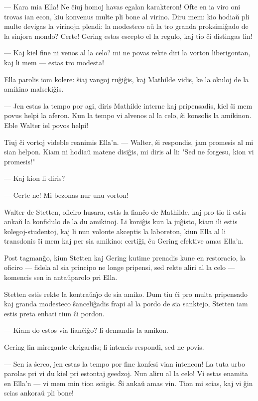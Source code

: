  --- Kara mia Ella! Ne \^ciuj homoj havas egalan karakteron! Ofte en ia
viro oni trovas ian econ, kiu konvenus multe pli bone al virino.
Diru mem: kio hodia\u u pli multe devigas la virinojn plendi: la
modesteco a\u u la tro granda proksimi\^gado de la sinjora mondo?
Certe! Gering estas escepto el la regulo, kaj tio \^ci distingas
lin!

 --- Kaj kiel fine ni venos al la celo? mi ne povas rekte diri la
vorton liberigontan, kaj li mem --- estas tro modesta!

   Ella parolis iom kolere: \^siaj vangoj ru\^gi\^gis, kaj Mathilde vidis,
ke la okuloj de la amikino malseki\^gis.

 --- Jen estas la tempo por agi, diris Mathilde interne kaj
pripensadis, kiel \^si mem povus helpi la aferon. Kun la tempo vi
alvenos al la celo, \^si konsolis la amikinon. Eble Walter iel povos
helpi!

   Tiuj \^ci vortoj videble reanimis Ella'n. --- Walter, \^si respondis,
jam promesis al mi sian helpon. Kiam ni hodia\u u matene disi\^gis,
mi diris al li: "Sed ne forgesu, kion vi promesis!"

 --- Kaj kion li diris?

 --- Certe ne! Mi bezonas nur unu vorton!

   Walter de Stetten, oficiro husara, estis la fian\^co de Mathilde, kaj
pro tio li estis anka\u u la konfidulo de la du amikinoj. Li
koni\^gis kun la ju\^gisto, kiam ili estis kolegoj-studentoj, kaj li
nun volonte akceptis la laboreton, kiun Ella al li transdonis \^si
mem kaj per sia amikino: certi\^gi, \^cu Gering efektive amas
Ella'n.

   Post tagman\^go, kiun Stetten kaj Gering kutime prenadis kune en
restoracio, la oficiro --- fidela al sia principo ne longe pripensi,
sed rekte aliri al la celo --- komencis sen ia anta\u uparolo pri
Ella.

   Stetten estis rekte la kontra\u ua\^{\j}o de sia amiko. Dum tiu \^ci pro
multa pripensado kaj granda modesteco \^sanceli\^gadis frapi al la
pordo de sia sanktejo, Stetten iam estis preta enbati tiun \^ci
pordon.

 --- Kiam do estos via fian\^ci\^go? li demandis la amikon.

   Gering lin miregante ekrigardis; li intencis respondi, sed ne povis.

 --- Sen ia \^serco, jen estas la tempo por fine konfesi vian intencon!
La tuta urbo parolas pri vi du kiel pri estontaj geedzoj. Nun aliru
al la celo! Vi estas enamita en Ella'n --- vi mem min tion sciigis.
\^Si anka\u u amas vin. Tion mi scias, kaj vi \^gin scias ankora\u u
pli bone!

